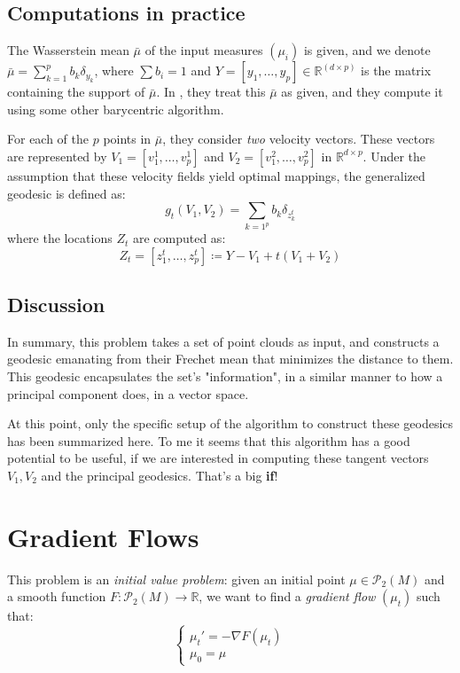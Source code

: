 \documentclass{article}
\begin{document}
\subsection{Computations in practice}

The Wasserstein mean $\bar\mu$ of the input measures $(\mu_i)$ is given,
and we denote $\bar\mu = \sum_{k=1}^pb_k\delta_{y_k}$, where $\sum b_i=1$
and $Y=[y_1,\dots, y_p]\in \mathbb{R}^(d\times p)$ is the matrix containing
the support of $\bar\mu$. In \cite{seguy2015principal}, they treat this $\bar\mu$
as given, and they compute it using some other barycentric algorithm.

For each of the $p$ points in $\bar\mu$, they consider \textit{two} velocity 
vectors. These vectors are represented by $V_1=[v_1^1,\dots,v_p^1]$ and  
$V_2=[v_1^2,\dots,v_p^2]$ in $\mathbb{R}^{d\times p}$. Under the assumption
that these velocity fields yield optimal mappings, the generalized geodesic
is defined as:
\[g_t(V_1, V_2) = \sum_{k=1^p}b_k\delta_{z^t_k} \]
where the locations $Z_t$ are computed as:
\[ Z_t = [z_1^t,\dots,z_p^t] \coloneqq Y-V_1 + t(V_1+V_2)\]


\subsection{Discussion}

In summary, this problem takes a set of point clouds as input, and constructs 
a geodesic emanating from their Frechet mean that minimizes the distance 
to them. This geodesic encapsulates the set's "information", in a similar 
manner to how a principal component does, in a vector space.

At this point, only the specific setup of the algorithm to construct these
geodesics has been summarized here. To me it seems that this algorithm has
a good potential to be useful, if we are interested in computing these tangent 
vectors $V_1, V_2$ and the principal geodesics. That's a big \textbf{if}!

\section{Gradient Flows}

This problem is an \textit{initial value problem}: given an initial point 
$\mu\in \mathscr{P}_2(M)$ and a smooth function $F:\mathscr{P}_2(M)\rightarrow
\mathbb{R}$, we want to find a \textit{gradient flow} $(\mu_t)$ such that:
\begin{equation*}
\begin{cases}
    \mu_t' = -\nabla F(\mu_t) \\
    \mu_0 = \mu
\end{cases}       
\end{equation*}
\end{document}
